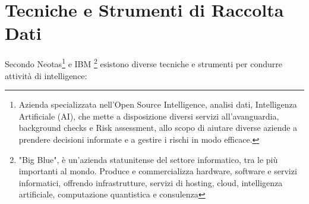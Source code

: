 \newpage
\section{Tecniche e Strumenti di Raccolta Dati}\label{sec:cap_sec_osint3}

Secondo Neotas\footnote{Azienda specializzata nell'Open Source Intelligence, analisi dati, Intelligenza Artificiale (AI), che mette a disposizione diversi servizi all'avanguardia, background checks e Risk assessment, allo scopo di aiutare diverse aziende a prendere decisioni informate e a gestire i rischi in modo efficace.} e IBM \footnote{"Big Blue", è un'azienda statunitense del settore informatico, tra le più importanti al mondo. Produce e commercializza hardware, software e servizi informatici, offrendo infrastrutture, servizi di hosting, cloud, intelligenza artificiale, computazione quantistica e consulenza} esistono diverse tecniche e strumenti per condurre attività di intelligence:

